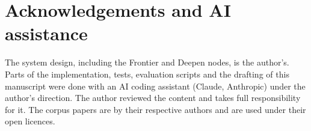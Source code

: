 \documentclass[11pt]{article}
\begin{document}
\section*{Acknowledgements and AI assistance}
The system design, including the Frontier and Deepen nodes, is the author's. Parts of the implementation, tests,
evaluation scripts and the drafting of this manuscript were done with an AI coding assistant (Claude, Anthropic)
under the author's direction. The author reviewed the content and takes full responsibility for it. The corpus
papers are by their respective authors and are used under their open licences.



\end{document}
